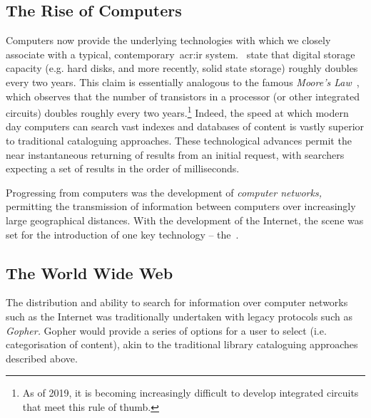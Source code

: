 \subsection{The Rise of Computers}
Computers now provide the underlying technologies with which we closely associate with a typical, contemporary~\gls{acr:ir} system.~\cite{sanderson2012history_of_ir} state that digital storage capacity (e.g. hard disks, and more recently, solid state storage) roughly doubles every two years. This claim is essentially analogous to the famous \emph{Moore's Law}~\citep{moore1965law}, which observes that the number of transistors in a processor (or other integrated circuits) doubles roughly every two years.\footnote{As of 2019, it is becoming increasingly difficult to develop integrated circuits that meet this rule of thumb.} Indeed, the speed at which modern day computers can search vast indexes and databases of content is vastly superior to traditional cataloguing approaches. These technological advances permit the near instantaneous returning of results from an initial request, with searchers expecting a set of results in the order of milliseconds.

Progressing from computers was the development of \emph{computer networks,} permitting the transmission of information between computers over increasingly large geographical distances. With the development of the Internet, the scene was set for the introduction of one key technology -- the~.

\subsection{The World Wide Web}
The distribution and ability to search for information over computer networks such as the Internet was traditionally undertaken with legacy protocols such as \emph{Gopher.} Gopher would provide a series of options for a user to select (i.e. categorisation of content), akin to the traditional library cataloguing approaches described above.

